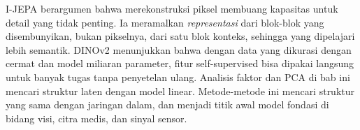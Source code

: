I-JEPA \citep{assran2023} berargumen bahwa merekonstruksi piksel membuang kapasitas untuk detail yang tidak penting.
Ia meramalkan \emph{representasi} dari blok-blok yang disembunyikan, bukan pikselnya, dari satu blok konteks, sehingga
yang dipelajari lebih semantik. DINOv2 \citep{oquab2023} menunjukkan bahwa dengan data yang dikurasi dengan cermat dan
model miliaran parameter, fitur self-supervised bisa dipakai langsung untuk banyak tugas tanpa penyetelan ulang. Analisis
faktor dan PCA di bab ini mencari struktur laten dengan model linear. Metode-metode ini mencari struktur yang sama dengan
jaringan dalam, dan menjadi titik awal model fondasi di bidang visi, citra medis, dan sinyal sensor.

